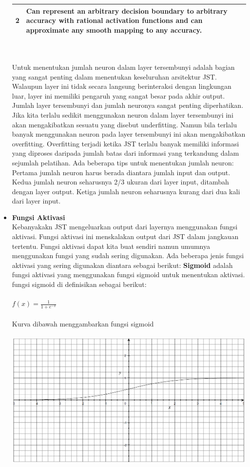 \begin{itemize}
\begin{tabular}{|l|p{7cm}|}
2 & Can represent an arbitrary decision boundary to arbitrary accuracy with rational activation functions and can approximate any smooth mapping to any accuracy.\\\hline
\end{tabular}\\\\
Untuk menentukan jumlah neuron dalam layer tersembunyi adalah bagian yang sangat penting dalam menentukan keseluruhan arsitektur JST. Walaupun layer ini tidak secara langsung berinteraksi dengan lingkungan luar, layer ini memiliki pengaruh yang sangat besar pada akhir output. Jumlah layer tersembunyi dan jumlah neuronya sangat penting diperhatikan. Jika kita terlalu sedikit menggunakan neuron dalam layer tersembunyi ini akan mengakibatkan sesuatu yang disebut underfitting. Namun bila terlalu banyak menggunakan neuron pada layer tersembunyi ini akan mengakibatkan overfitting. Overfitting terjadi ketika JST terlalu banyak memiliki informasi yang diproses daripada jumlah batas dari informasi yang terkandung dalam sejumlah pelatihan. Ada beberapa tips untuk menentukan jumlah neuron: Pertama jumlah neuron harus berada diantara jumlah input dan output. Kedua jumlah neuron seharusnya 2/3 ukuran dari layer input, ditambah dengan layer output. Ketiga jumlah neuron seharusnya kurang dari dua kali dari layer input.
\item\textbf{Fungsi Aktivasi}\\
Kebanyakakn JST mengeluarkan output dari layernya menggunakan fungsi aktivasi. Fungsi aktivasi ini menskalakan output dari JST dalam jangkauan tertentu. Fungsi aktivasi dapat kita buat sendiri namun umumnya menggunakan fungsi yang sudah sering digunakan. Ada beberapa jenis fungsi aktivasi yang sering digunakan diantara sebagai berikut:
\textbf{Sigmoid} adalah fungsi aktivasi yang menggunakan fungsi sigmoid untuk menentukan aktivasi. fungsi sigmoid di definisikan sebagai berikut:\\\\
$f(x)=\frac{1}{1+e^{-x}}$\\\\
Kurva dibawah menggambarkan fungsi sigmoid\\\\
\includegraphics[width=\linewidth]{Gambar/mine/sigmoid}

\end{itemize}
